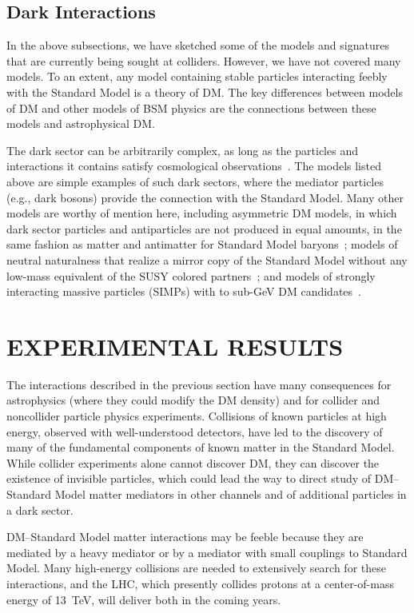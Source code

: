 \documentclass{ar-1col}
\newcommand{\IP}{invisible particle}
\begin{document}
{\subsection{Dark Interactions}\label{sec:darkint}

In the above subsections, we have sketched some of the models and signatures
that are currently being sought at colliders. However, we have not covered many models. 
To an extent, any model containing stable particles interacting
feebly with the Standard Model is a theory of DM.
The key differences between models of DM and other models of BSM
physics are the connections
between these models and astrophysical DM.

The dark sector can be arbitrarily complex, as long as the
particles and interactions it contains satisfy cosmological
observations~\cite{Strassler:2006im, Evans:2017kti}. The models
listed above are simple examples of such dark sectors, where the
mediator particles (e.g., dark bosons) provide the connection with
the Standard Model. Many other models are worthy of mention here, including
asymmetric DM models, in which dark sector particles and
antiparticles are not produced in equal amounts, in the same
fashion as matter and antimatter for Standard Model
baryons~\cite{Zurek:2013wia}; models of neutral
naturalness that realize a mirror copy of the Standard Model without any
low-mass equivalent of the SUSY colored
partners~\cite{Craig:2014aea}; and models of strongly interacting 
massive particles (SIMPs) with to sub-GeV DM candidates~\cite{Hochberg:2014dra}.

\section{EXPERIMENTAL RESULTS}\label{sec:03_ExperimentalResults}

The interactions described in the previous section have many
consequences for astrophysics (where they could modify the DM
density) and for collider and noncollider particle physics
experiments.
Collisions of known particles at high energy, observed with
well-understood detectors, have led to the discovery of many of the fundamental components of
known matter in the Standard Model. While collider experiments alone cannot
discover DM, they can discover {the existence of \IP}s, which could lead the way to
direct study of DM--Standard Model matter mediators in other channels and of
additional particles in a dark sector. 

DM--Standard Model matter interactions may be
feeble because they are mediated by a heavy mediator or by a
mediator with small couplings to Standard Model. Many high-energy collisions are needed to extensively search for these interactions, and the
LHC, which presently collides protons at a center-of-mass energy
of 13~TeV, will deliver both in the coming years.

}
\end{document}
